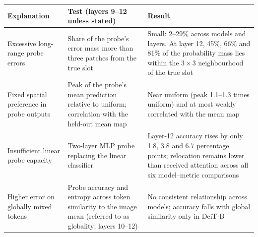 \footnotesize
\setlength{\tabcolsep}{4pt}
\renewcommand{\arraystretch}{1.0}
\begin{tabular}{@{}>{\raggedright\arraybackslash}p{2.9cm}>{\raggedright\arraybackslash}p{4.7cm}>{\raggedright\arraybackslash}p{5.75cm}@{}}
\toprule
Explanation & Test (layers 9--12 unless stated) & Result \\
\midrule
Excessive long-range probe errors & Share of the probe's error mass more than three patches from the true slot & Small: 2--29\% across models and layers. At layer 12, 45\%, 66\% and 81\% of the probability mass lies within the $3{\times}3$ neighbourhood of the true slot \\
Fixed spatial preference in probe outputs & Peak of the probe's mean prediction relative to uniform; correlation with the held-out mean map & Near uniform (peak 1.1--1.3 times uniform) and at most weakly correlated with the mean map \\
Insufficient linear probe capacity & Two-layer MLP probe replacing the linear classifier & Layer-12 accuracy rises by only 1.8, 3.8 and 6.7 percentage points; relocation remains lower than received attention across all six model--metric comparisons \\
Higher error on globally mixed tokens & Probe accuracy and entropy across token similarity to the image mean (referred to as globality; layers 10--12) & No consistent relationship across models; accuracy falls with global similarity only in DeiT-B \\
\bottomrule
\end{tabular}
